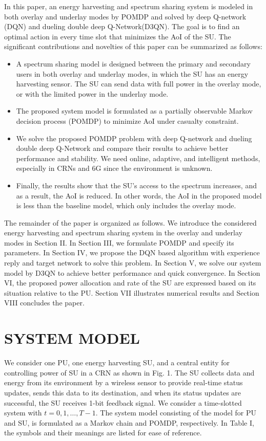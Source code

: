 \documentclass[journal]{IEEEtran}
\begin{document}
		In this paper, an energy harvesting and spectrum sharing system is modeled in both overlay and underlay modes by POMDP and solved by deep Q-network (DQN) and dueling double deep Q-Network(D3QN). The goal is to find an optimal action in every time slot that minimizes the AoI of the SU. The significant contributions and novelties of this paper can be summarized as follows:
		\begin{itemize}
			\item A spectrum sharing model is designed between the primary and secondary users in both overlay and underlay modes, in which the SU has an energy harvesting sensor. The SU can send data with full power in the overlay mode, or with the limited power in the underlay mode.
			\item The proposed system model is formulated as a partially observable Markov decision process (POMDP) to minimize AoI under casualty constraint.
			\item We solve the proposed POMDP problem with deep Q-network and dueling double deep Q-Network and compare their results to achieve better performance and stability. We need online, adaptive, and intelligent methods, especially in CRNs and 6G since the environment is unknown.
			\item Finally, the results show that the SU's access to the spectrum increases, and as a result, the AoI is reduced. In other words, the AoI in the proposed model is less than the baseline model, which only includes the overlay mode.
		\end{itemize}
		The remainder of the paper is organized as follows. We introduce the considered energy harvesting and spectrum sharing system in the overlay and underlay modes in Section II. In Section III, we formulate POMDP and specify its parameters. In Section IV, we propose the DQN based algorithm with experience reply and target network to solve this problem. In Section V, we solve our system model by D3QN to achieve better performance and quick convergence. In Section VI, the proposed power allocation and rate of the SU are expressed based on its situation relative to the PU. Section VII illustrates numerical results and Section VIII concludes the paper.

	\section{SYSTEM MODEL}
		We consider one PU, one energy harvesting SU, and a central entity for controlling power of SU in a CRN as shown in Fig. 1. The SU collects data and energy from its environment by a wireless sensor to provide real-time status updates, sends this data to its destination, and when its status updates are successful, the SU receives 1-bit feedback signal. We consider a time-slotted system with $t = 0,1,…,T-1$. The system model consisting of the model for PU and SU, is formulated as a Markov chain and POMDP, respectively. In Table I, the symbols and their meanings are listed for ease of reference.
\end{document}
